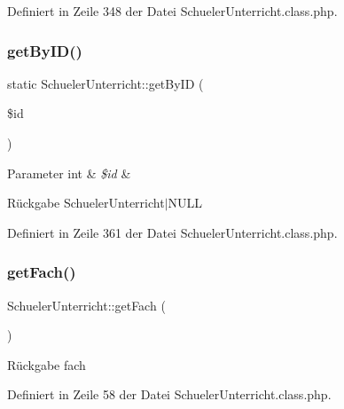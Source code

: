 Definiert in Zeile 348 der Datei Schueler\+Unterricht.\+class.\+php.

\mbox{\label{class_schueler_unterricht_a2c494573c70fcd5405f9c21237115a74}} 
\subsubsection{\texorpdfstring{get\+By\+I\+D()}{getByID()}}
{\footnotesize\ttfamily static Schueler\+Unterricht\+::get\+By\+ID (\begin{DoxyParamCaption}\item[{}]{\$id }\end{DoxyParamCaption})\hspace{0.3cm}{\ttfamily [static]}}


\begin{DoxyParams}[1]{Parameter}
int & {\em \$id} & \\
\hline
\end{DoxyParams}
\begin{DoxyReturn}{Rückgabe}
Schueler\+Unterricht$\vert$\+N\+U\+LL 
\end{DoxyReturn}


Definiert in Zeile 361 der Datei Schueler\+Unterricht.\+class.\+php.

\mbox{\label{class_schueler_unterricht_a7d339729cff574e8b6bd8fa0b620ca09}} 
\subsubsection{\texorpdfstring{get\+Fach()}{getFach()}}
{\footnotesize\ttfamily Schueler\+Unterricht\+::get\+Fach (\begin{DoxyParamCaption}{ }\end{DoxyParamCaption})}

\begin{DoxyReturn}{Rückgabe}
fach 
\end{DoxyReturn}


Definiert in Zeile 58 der Datei Schueler\+Unterricht.\+class.\+php.

\mbox{\label{class_schueler_unterricht_a109cdab0686a171d97cd3598d864a6c9}} 

